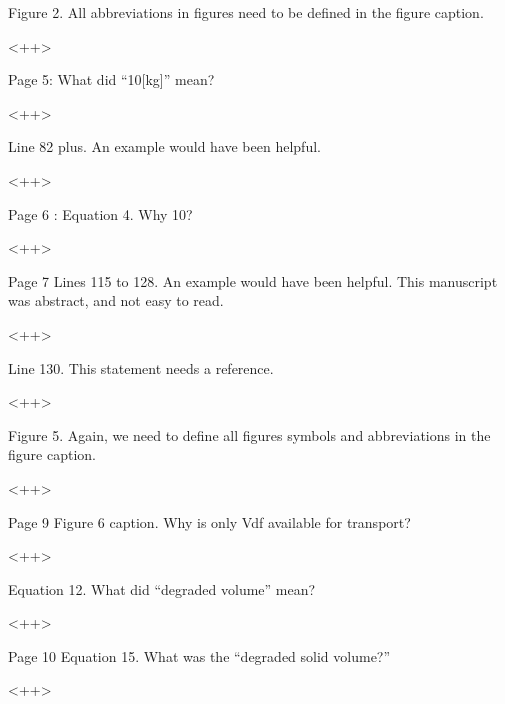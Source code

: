 \documentclass[answers,12pt]{exam}
\begin{document}
\begin{questions}
\question Figure 2. All abbreviations in figures need to be defined in the figure caption.
\begin{solution}
<++>
\end{solution}
 

\question Page 5: What did “10[kg]” mean?
\begin{solution}
<++>
\end{solution}

 

\question Line 82 plus. An example would have been helpful.
\begin{solution}
<++>
\end{solution}

 

\question Page 6 : Equation 4. Why 10?

 
\begin{solution}
<++>
\end{solution}

\question Page 7 Lines 115 to 128. An example would have been helpful. This manuscript was abstract, and not easy to read.

\begin{solution}
<++>
\end{solution}
 

\question Line 130. This statement needs a reference.

\begin{solution}
<++>
\end{solution}

\question Figure 5. Again, we need to define all figures symbols and abbreviations in the figure caption.
\begin{solution}
<++>
\end{solution}

 

\question Page 9 Figure 6 caption. Why is only Vdf available for transport?
\begin{solution}
<++>
\end{solution}
 

\question Equation 12. What did “degraded volume” mean?
\begin{solution}
<++>
\end{solution}

 

\question Page 10 Equation 15. What was the “degraded solid volume?”

\begin{solution}
<++>
\end{solution}
 


\end{questions}
\end{document}
